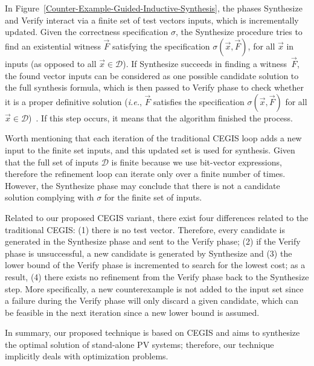 \documentclass[a4paper,donotrepeattitle,fleqn]{cas-dc}
\begin{document}
In Figure~\ref{Counter-Example-Guided-Inductive-Synthesis}, the phases {\sc Synthesize} and {\sc Verify} interact via a finite set of test vectors {\sc inputs}, which is incrementally updated. Given the correctness specification $\sigma$, the {\sc Synthesize} procedure tries to find an existential witness $\vec{F}$ satisfying the specification $\sigma(\vec{x}, \vec{F})$, for all $\vec{x}$ in {\sc inputs} (as opposed to all $\vec{x} \in \mathcal{D}$). If {\sc Synthesize} succeeds in finding a witness~$\vec{F}$, the found vector {\sc inputs} can be considered as one possible candidate solution to the full synthesis formula, which is then passed to {\sc Verify} phase to check whether it is a proper definitive solution ({\it i.e.}, $\vec{F}$ satisfies the specification $\sigma(\vec{x}, \vec{F})$ for all $\vec{x}\in\mathcal{D}$)~\cite{iet-cps.2018.5006}. If this step occurs, it means that the algorithm finished the process. 

Worth mentioning that each iteration of the traditional CEGIS loop adds a new input to the finite set {\sc inputs}, and this updated set is used for synthesis. Given that the full set of inputs $\mathcal{D}$ is finite because we use bit-vector expressions, therefore the refinement loop can iterate only over a finite number of times. However, the {\sc Synthesize} phase may conclude that there is not a candidate solution complying with $\sigma$ for the finite set of {\sc inputs}.

Related to our proposed CEGIS variant, there exist four differences related to the traditional CEGIS:
(1) there is no test vector. Therefore, every candidate is generated in the {\sc Synthesize} phase and sent to the {\sc Verify} phase; 
(2) if the {\sc Verify} phase is unsuccessful, a new candidate is generated by {\sc Synthesize} and 
(3) the lower bound of the {\sc Verify} phase is incremented to search for the lowest cost; as a result,
(4) there exists no refinement from the {\sc Verify} phase back to the {\sc Synthesize} step. More specifically, a new counterexample is not added to the {\sc input} set since a failure during the {\sc Verify} phase will only discard a given candidate, which can be feasible in the next iteration since a new lower bound is assumed.

In summary, our proposed technique is based on CEGIS and aims to synthesize the optimal solution of stand-alone PV systems; therefore, our technique implicitly deals with optimization problems.

\end{document}
